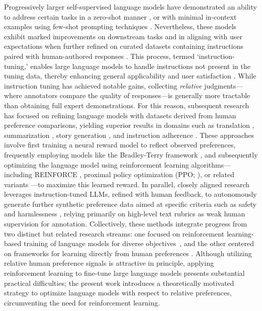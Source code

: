 Progressively larger self-supervised language models have demonstrated an ability to address certain tasks in a zero-shot manner \citep{radford2019language}, or with minimal in-context examples using few-shot prompting techniques \citep{gpt3,megatron,chowdhery2022palm}. Nevertheless, these models exhibit marked improvements on downstream tasks and in aligning with user expectations when further refined on curated datasets containing instructions paired with human-authored responses \citep{mishra-etal-2022-cross,sanh2022multitask,chung2022scaling,thoppilan2022lamda}. This process, termed `instruction-tuning,' enables large language models to handle instructions not present in the tuning data, thereby enhancing general applicability and user satisfaction \citep{chung2022scaling}. While instruction tuning has achieved notable gains, collecting \textit{relative} judgments—where annotators compare the quality of responses—is generally more tractable than obtaining full expert demonstrations. For this reason, subsequent research has focused on refining language models with datasets derived from human preference comparisons, yielding superior results in domains such as translation \citep{kreutzer-etal-2018-reliability}, summarization \citep{stiennon2022learning,ziegler2020finetuning}, story generation \citep{ziegler2020finetuning}, and instruction adherence \citep{ouyang2022training,ramamurthy2023is}. These approaches involve first training a neural reward model to reflect observed preferences, frequently employing models like the Bradley-Terry framework \citep{bradley1952rankanalysis}, and subsequently optimizing the language model using reinforcement learning algorithms—including REINFORCE \citep{williams1992reinforce}, proximal policy optimization (PPO; \cite{schulman2017proximal}), or related variants \citep{ramamurthy2023is}—to maximize this learned reward. In parallel, closely aligned research leverages instruction-tuned LLMs, refined with human feedback, to autonomously generate further synthetic preference data aimed at specific criteria such as safety and harmlessness \citep{bai2022constitutional}, relying primarily on high-level text rubrics as weak human supervision for annotation. Collectively, these methods integrate progress from two distinct but related research streams: one focused on reinforcement learning-based training of language models for diverse objectives~\citep{Ranzato2015SequenceLT,paulus2018a,wu2018learning}, and the other centered on frameworks for learning directly from human preferences \citep{christiano2017deep,kupcsik2018learning}. Although utilizing relative human preference signals is attractive in principle, applying reinforcement learning to fine-tune large language models presents substantial practical difficulties; the present work introduces a theoretically motivated strategy to optimize language models with respect to relative preferences, circumventing the need for reinforcement learning.


